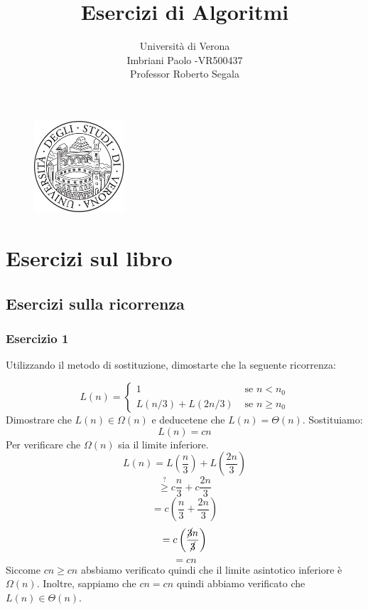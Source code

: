 \documentclass[12pt]{article}
\title{Esercizi di Algoritmi}
\author{Università di Verona\\Imbriani Paolo -VR500437\\Professor Roberto Segala}
\begin{document}
\begin{figure}
    \centering
    \includegraphics[width=0.3\textwidth]{UniversityofVerona.png}
    \label{fig:centered-image}
\end{figure}

\maketitle 

\pagebreak

\tableofcontents

\pagebreak

\section{Esercizi sul libro}

\subsection{Esercizi sulla ricorrenza}

\subsubsection{Esercizio 1}
Utilizzando il metodo di sostituzione, dimostarte che la seguente ricorrenza:

\[L(n) = \begin{cases}
    1 & \text{ se } n < n_0\\
    L(n/3) + L(2n/3) & \text{ se } n \ge n_0
\end{cases}\]
Dimostrare che $L(n) \in \Omega(n)$ e deducetene che $L(n) = \Theta(n)$.
Sostituiamo: 
\[L(n) = cn\]
Per verificare che $\Omega(n)$ sia il limite inferiore.
\[L(n) = L\left(\frac{n}{3}\right) + L\left(\frac{2n}{3}\right)\] 
\[\stackrel{?}{\ge} c\frac{n}{3} + c \frac{2n}{3}\]
\[= c\left(\frac{n}{3} + \frac{2n}{3}\right)\]
\[= c\left(\frac{\cancel{3}n}{\cancel{3}}\right)\]
\[= cn\]
Siccome $cn \ge cn$ absbiamo verificato quindi che il limite asintotico inferiore è $\Omega(n)$.
Inoltre, sappiamo che $cn = cn$ quindi abbiamo verificato che $L(n) \in \Theta(n)$.
\end{document}
